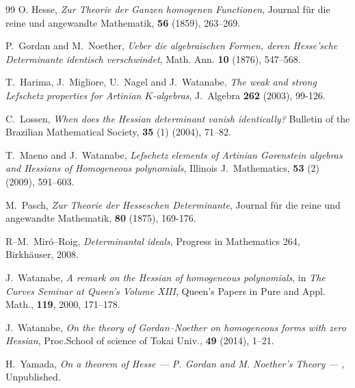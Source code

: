 \documentclass[12pt]{article}
\theoremstyle{definition}
\theoremstyle{remark}
\begin{document}
\begin{thebibliography}{99}
O. Hesse, {\it Zur Theorie der Ganzen homogenen Functionen}, 
Journal f\"ur die reine und angewandte Mathematik, 
 {\bf 56} (1859), 263--269. 

P.\ Gordan and M.\ Noether, {\it Ueber die algebraischen  Formen, deren 
Hesse'sche Determinante identisch verschwindet}, Math. Ann. {\bf 10} (1876), 547--568. 


 T.\ Harima, J.\  Migliore, U.\ Nagel and J.\  Watanabe, {\it The weak and 
strong Lefschetz properties for Artinian $K$-algebras}, J.\ Algebra {\bf 262} (2003), 
99-126. 


C.\  Lossen, 
\emph{When does the Hessian determinant vanish identically?}
Bulletin of the Brazilian Mathematical Society, \textbf{35} (1) (2004), 71--82.


T.\ Maeno and J.\ Watanabe, 
\emph{Lefschetz elements of Artinian Gorenstein algebras and Hessians of Homogeneous polynomials},
Illinois J.\  Mathematics, \textbf{53} (2) (2009), 591--603. 


M.\ Pasch, {\it Zur Theorie der Hesseschen Determinante}, 
Journal f\"{u}r die reine und angewandte Mathematik, \textbf{80} (1875), 169-176.   


R--M.\  Mir\'{o}--Roig, {\it Determinantal ideals}, 
Progress in Mathematics 264, 
Birkh\"auser, 2008.   
   

 J.\ Watanabe, {\it A remark on the Hessian 
of homogeneous polynomials}, in {\it The Curves Seminar at Queen's Volume XIII}, 
  Queen's Papers in Pure and Appl. Math., \textbf{119}, 2000, 171--178.

 J.\ Watanabe,
{\it On the theory of Gordan--Noether on homogeneous forms with zero Hessian},  
Proc.\@ School of science of Tokai Univ., \textbf{49} (2014), 1--21.

H.\ Yamada, {\it On a theorem of Hesse --- P. Gordan and M. Noether's Theory --- },  Unpublished. 

\end{thebibliography}
\end{document}
